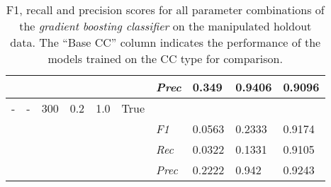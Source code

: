 \begin{table}[H]
\begin{tabularx}{\textwidth}{XXXXXX|X|X|X|X}
    & & & & & & \textit{Prec} & 0.349 & 0.9406 & 0.9096 \\ \midrule
    - & - & 300 & 0.2 & 1.0 &True & & & & \\
    & & & & & & \textit{F1} & 0.0563 & 0.2333   & 0.9174     \\
    & & & & & & \textit{Rec} &  0.0322 & 0.1331 & 0.9105   \\
    & & & & & & \textit{Prec} & 0.2222 & 0.942 & 0.9243 \\ \midrule
    \end{tabularx}
    \caption{F1, recall and precision scores for all parameter combinations of the \textit{gradient boosting classifier} on the manipulated holdout data. The \enquote{Base CC} column indicates the performance of the models trained on the CC type for comparison. }
    \label{tab:rq3_gradient_boosting_classifier}
    \end{table}
    
